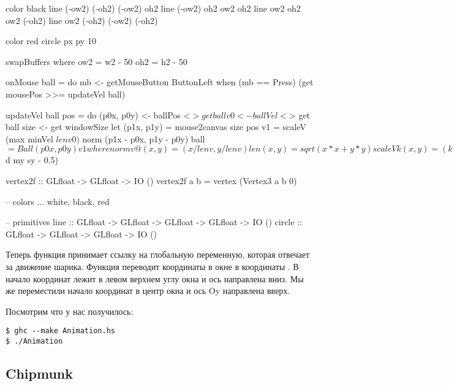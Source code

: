 \begin{code}
    color black
    line (-ow2) (-oh2) (-ow2) oh2
    line (-ow2) oh2    ow2    oh2
    line ow2    oh2    ow2    (-oh2)
    line ow2   (-oh2)  (-ow2) (-oh2)

    color red
    circle px py 10

    swapBuffers
    where ow2 = w2 - 50 
          oh2 = h2 - 50  
    
onMouse ball = do
    mb <- getMouseButton ButtonLeft
    when (mb == Press) (get mousePos >>= updateVel ball)
   
updateVel ball pos = do
    (p0x, p0y) <- ballPos <$> get ball
    v0  <- ballVel <$> get ball
    size <- get windowSize
    let (p1x, p1y) = mouse2canvas size pos 
        v1 = scaleV (max minVel $ len v0) $ norm (p1x - p0x, p1y - p0y)
    ball $= Ball (p0x, p0y) v1
    where norm v@(x, y) = (x / len v, y / len v)
          len  (x, y) = sqrt (x*x + y*y) 
          scaleV k (x, y) = (k*x, k*y)

mouse2canvas :: Size -> Position -> (GLfloat, GLfloat)
mouse2canvas (Size sx sy) (Position mx my) = (x, y)
    where d a b  = fromIntegral a / fromIntegral b
          x  = fromIntegral width * (d mx sx - 0.5)
          y  = fromIntegral height * (negate $ d my sy - 0.5)

vertex2f :: GLfloat -> GLfloat -> IO ()
vertex2f a b = vertex (Vertex3 a b 0)

-- colors
... white, black, red  

-- primitives
line    :: GLfloat -> GLfloat -> GLfloat -> GLfloat -> IO ()
circle  :: GLfloat -> GLfloat -> GLfloat -> IO ()
\end{code}

Теперь функция  принимает ссылку на глобальную переменную,
которая отвечает за движение шарика. Функция  переводит
координаты в окне  в координаты . В  начало
координат лежит в левом верхнем углу окна и ось  направлена вниз.
Мы же переместили начало координат в центр окна и ось Oy направлена
вверх.

Посмотрим что у нас получилось:


\begin{verbatim}
$ ghc --make Animation.hs
$ ./Animation
\end{verbatim}

\subsection{Chipmunk}

